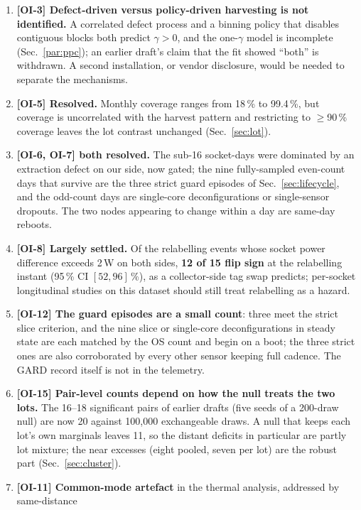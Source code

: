 \documentclass[10pt,conference]{IEEEtran}
\begin{document}
\begin{enumerate}
systematic but necessarily incomplete search, and the closest prior work we
found~\cite{mccalpin2021knl,smith2020p9layout} is discussed under Related work.
\item \textbf{[OI-3] Defect-driven versus policy-driven harvesting is not identified.} A
correlated defect process and a binning policy that disables contiguous blocks both predict
$\gamma>0$, and the one-$\gamma$ model is incomplete (Sec.~\ref{par:ppc}); an earlier draft's
claim that the fit showed ``both'' is withdrawn. A second installation, or vendor disclosure,
would be needed to separate the mechanisms.
\item \textbf{[OI-5] Resolved.} Monthly coverage ranges from 18\,\% to 99.4\,\%, but coverage is
uncorrelated with the harvest pattern and restricting to $\ge$90\,\% coverage leaves the lot
contrast unchanged (Sec.~\ref{sec:lot}).
\item \textbf{[OI-6, OI-7] both resolved.} The sub-16 socket-days were dominated by an
extraction defect on our side, now gated; the nine fully-sampled even-count days that survive are
the three strict guard episodes of Sec.~\ref{sec:lifecycle}, and the odd-count days are single-core
deconfigurations or single-sensor dropouts. The two nodes appearing to change within a day are
same-day reboots.
\item \textbf{[OI-8] Largely settled.} Of the relabelling events whose socket power difference
exceeds 2\,W on both sides, \textbf{12 of 15 flip sign} at the relabelling instant (95\,\% CI
$[52,96]$\,\%), as a collector-side tag swap predicts; per-socket longitudinal studies on this
dataset should still treat relabelling as a hazard.
\item \textbf{[OI-12] The guard episodes are a small count}: three meet the strict slice
criterion, and the nine slice or single-core deconfigurations in steady state are each matched by
the OS count and begin on a boot; the three strict ones are also corroborated by every other sensor
keeping full cadence. The GARD record itself is not in the telemetry.
\item \textbf{[OI-15] Pair-level counts depend on how the null treats the two lots.} The 16--18
significant pairs of earlier drafts (five seeds of a 200-draw null) are now 20 against 100{,}000
exchangeable draws. A null that keeps each lot's own marginals leaves 11, so the distant deficits in
particular are partly lot mixture; the near excesses (eight pooled, seven per lot) are the robust
part (Sec.~\ref{sec:cluster}).
\item \textbf{[OI-11] Common-mode artefact} in the thermal analysis, addressed by same-distance

\end{enumerate}
\end{document}
